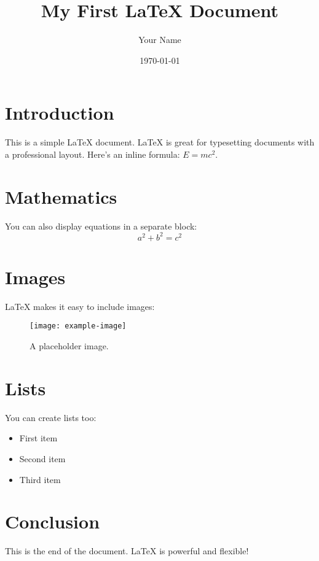 \documentclass{article}
\title{My First LaTeX Document}
\author{Your Name}
\date{\today}
\begin{document}
\maketitle

\section{Introduction}
This is a simple LaTeX document. LaTeX is great for typesetting documents with a professional layout. Here’s an inline formula: \( E = mc^2 \).

\section{Mathematics}
You can also display equations in a separate block:
\begin{equation}
  a^2 + b^2 = c^2
\end{equation}

\section{Images}
LaTeX makes it easy to include images:
\begin{figure}[h!]
    \centering
    \texttt{[image: example-image]}
    \caption{A placeholder image.}
\end{figure}

\section{Lists}
You can create lists too:
\begin{itemize}
    \item First item
    \item Second item
    \item Third item
\end{itemize}

\section{Conclusion}
This is the end of the document. LaTeX is powerful and flexible!
\end{document}
